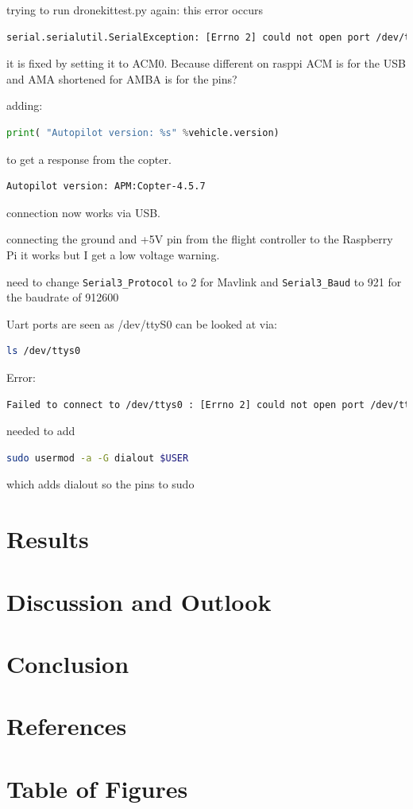 \documentclass{article}
\begin{document}
	trying to run dronekittest.py again: this error occurs
	
	\begin{lstlisting}[language=bash]
		serial.serialutil.SerialException: [Errno 2] could not open port /dev/ttyAMA0: [Errno 2] No such file or directory: '/dev/ttyAMA0'
	\end{lstlisting}
	it is fixed by setting it to ACM0. Because different on rasppi ACM is for the USB and AMA shortened for AMBA is for the pins? \cite{ttyAMA}
	
	adding:
	\begin{lstlisting}[language=python, caption={Python Dronekittest 2}]
		print( "Autopilot version: %s" %vehicle.version)
	\end{lstlisting}
	to get a response from the copter. 
	\begin{lstlisting}[language=bash]
		Autopilot version: APM:Copter-4.5.7
	\end{lstlisting}
	connection now works via USB.
	
	connecting the ground and +5V pin from the flight controller to the Raspberry Pi it works but I get a low voltage warning.
	
	need to change \lstinline|Serial3_Protocol| to 2 for Mavlink
	and \lstinline|Serial3_Baud| to 921 for the baudrate of 912600
	
	Uart ports are seen as /dev/ttyS0
	can be looked at via:
	\begin{lstlisting}[language=bash]
		ls /dev/ttys0
	\end{lstlisting}
	
	Error: 
	\begin{lstlisting}[language=bash]
		Failed to connect to /dev/ttys0 : [Errno 2] could not open port /dev/ttys0: [Errno 2] No such file or directory: '/dev/ttys0'
	\end{lstlisting}
	
	needed to add 
	\begin{lstlisting}[language=bash]
		sudo usermod -a -G dialout $USER
	\end{lstlisting}
	which adds dialout so the pins to sudo
	
	
	
	\section{Results}
	\section{Discussion and Outlook}
	\section{Conclusion}
	
	\section{References}
	\printbibliography[
	heading=bibintoc,
	title={Bibliography}
	]	
	\section{Table of Figures}
\end{document}
